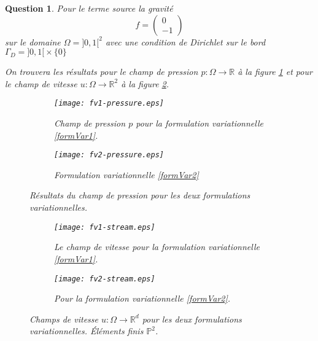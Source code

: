 \documentclass{article}
\newcommand{\RR}{\mathbb R}
\newcommand{\PP}{\mathbb P}
\theoremstyle{plain}
\newtheorem{ques}{Question}
\begin{document}
\begin{ques}
    Pour le terme source la gravité
    \[
        f = \begin{pmatrix}0 \\ -1\end{pmatrix}
    \]
    sur le domaine $\Omega = {]0,1 [}^2$ avec une condition de Dirichlet sur le bord $\Gamma_D = {]0,1[}\times \{0\}$

    

    On trouvera les résultats pour le champ de pression $p:\Omega\longrightarrow\RR$ à la figure \ref{fig:ques10pressure} et pour le champ de vitesse $u:\Omega\longrightarrow\RR^2$ à la figure \ref{fig:ques10speed}.

    \begin{figure}[h]
        \begin{subfigure}{0.96\textwidth}
            \texttt{[image: fv1-pressure.eps]}
            \caption{Champ de pression $p$ pour la formulation variationnelle \eqref{formVar1}.}
        \end{subfigure}
        \begin{subfigure}{0.96\textwidth}
            \texttt{[image: fv2-pressure.eps]}
            \caption{Formulation variationnelle \eqref{formVar2}}
        \end{subfigure}
        \caption{Résultats du champ de pression pour les deux formulations variationnelles.}
        \label{fig:ques10pressure}
    \end{figure}
    \begin{figure}[h]
        \begin{subfigure}{\textwidth}
            \texttt{[image: fv1-stream.eps]}
            \caption{Le champ de vitesse pour la formulation variationnelle \eqref{formVar1}.}
        \end{subfigure}
        \begin{subfigure}{\textwidth}
            \texttt{[image: fv2-stream.eps]}
            \caption{Pour la formulation variationnelle \eqref{formVar2}.}
        \end{subfigure}
        \caption{Champs de vitesse $u:\Omega\longrightarrow\RR^d$ pour les deux formulations variationnelles. Éléments finis $\PP^2$.}
        \label{fig:ques10speed}
    \end{figure}
\end{ques}
\end{document}
